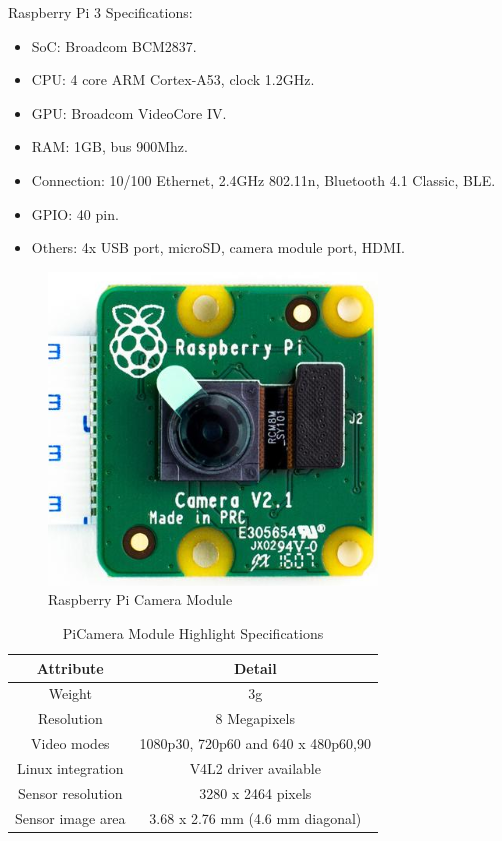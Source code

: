 Raspberry Pi 3 Specifications:
\begin{itemize}
  \item SoC: Broadcom BCM2837.
  \item CPU: 4 core ARM Cortex-A53, clock 1.2GHz.
  \item GPU: Broadcom VideoCore IV.
  \item RAM: 1GB, bus 900Mhz.
  \item Connection: 10/100 Ethernet, 2.4GHz 802.11n, Bluetooth 4.1 Classic, BLE.
  \item GPIO: 40 pin.
  \item Others: 4x USB port, microSD, camera module port, HDMI.
\end{itemize}
\begin{figure}[!ht]
  \begin{center}
  \includegraphics[scale=1]{images/piCamModule.png}
  \caption{Raspberry Pi Camera Module}
  \label{fig:piCamModule}
  \end{center}
\end{figure}
\begin{table}[h!]
  \begin{center}
  \begin{tabular}{ |c|c|  }
    \hline
    Attribute & Detail\\
    \hline
    Weight& 3g\\
    \hline
    Resolution&   8 Megapixels\\
    \hline
    Video modes &1080p30, 720p60 and 640 x 480p60,90\\
    \hline
    Linux integration & V4L2 driver available\\
    \hline
    Sensor resolution & 3280 x 2464 pixels\\
    \hline
    Sensor image area & 3.68 x 2.76 mm (4.6 mm diagonal)\\
    \hline
   \end{tabular}
   \caption{PiCamera Module Highlight Specifications}
   \label{table:piCamSpecs}
  \end{center}
  \end{table}
